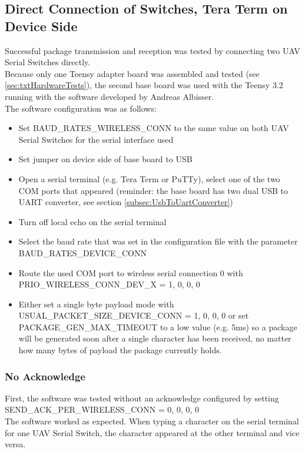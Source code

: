 \subsection{Direct Connection of Switches, Tera Term on Device Side} \label{subsec:txtTestDirectConnTeraTerm}
%
Successful package transmission and reception was tested by connecting two UAV Serial Switches directly.\\
Because only one Teensy adapter board was assembled and tested (see \autoref{sec:txtHardwareTests}), the second base board was used with the Teensy 3.2 running with the software developed by Andreas Albisser.\\
The software configuration was as follows:
\begin{itemize}
    \item Set BAUD\_RATES\_WIRELESS\_CONN to the same value on both UAV Serial Switches for the serial interface used
    \item Set jumper on device side of base board to USB
    \item Open a serial terminal (e.g. Tera Term or PuTTy), select one of the two COM ports that appeared (reminder: the base board has two dual USB to UART converter, see section \ref{subsec:UsbToUartConverter})
    \item Turn off local echo on the serial terminal
    \item Select the baud rate that was set in the configuration file with the parameter BAUD\_RATES\_DEVICE\_CONN
    \item Route the used COM port to wireless serial connection 0 with PRIO\_WIRELESS\_CONN\_DEV\_X = 1, 0, 0, 0
    \item Either set a single byte payload mode with USUAL\_PACKET\_SIZE\_DEVICE\_CONN = 1, 0, 0, 0 or set PACKAGE\_GEN\_MAX\_TIMEOUT to a low value (e.g. 5ms) so a package will be generated soon after a single character has been received, no matter how many bytes of payload the package currently holds.
\end{itemize}
%
\subsubsection{No Acknowledge}
First, the software was tested without an acknowledge configured by setting SEND\_ACK\_PER\_WIRELESS\_CONN = 0, 0, 0, 0\\
The software worked as expected. When typing a character on the serial terminal for one UAV Serial Switch, the character appeared at the other terminal and vice versa.
%
